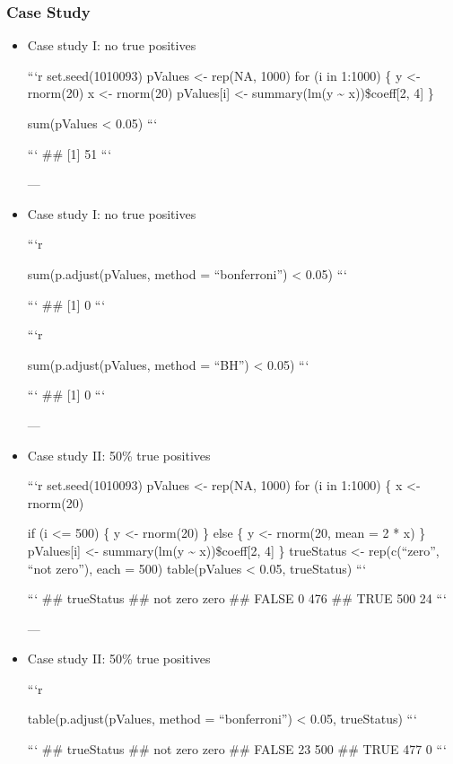 \documentclass[10pt,article]{article}
\begin{document}
\subsubsection{Case Study}
\label{sec:orgd39c5a1}
\begin{itemize}
\item Case study I: no true positives
\label{sec:org014a8fc}


```r
set.seed(1010093)
pValues <- rep(NA, 1000)
for (i in 1:1000) \{
    y <- rnorm(20)
    x <- rnorm(20)
    pValues[i] <- summary(lm(y \textasciitilde{} x))\$coeff[2, 4]
\}

sum(pValues < 0.05)
```

```
\#\# [1] 51
```


---

\item Case study I: no true positives
\label{sec:org3feed36}


```r

sum(p.adjust(pValues, method = ``bonferroni'') < 0.05)
```

```
\#\# [1] 0
```

```r

sum(p.adjust(pValues, method = ``BH'') < 0.05)
```

```
\#\# [1] 0
```



---

\item Case study II: 50\% true positives
\label{sec:org0db8963}


```r
set.seed(1010093)
pValues <- rep(NA, 1000)
for (i in 1:1000) \{
    x <- rnorm(20)

    if (i <= 500) \{
        y <- rnorm(20)
    \} else \{
        y <- rnorm(20, mean = 2 * x)
    \}
    pValues[i] <- summary(lm(y \textasciitilde{} x))\$coeff[2, 4]
\}
trueStatus <- rep(c(``zero'', ``not zero''), each = 500)
table(pValues < 0.05, trueStatus)
```

```
\#\#        trueStatus
\#\#         not zero zero
\#\#   FALSE        0  476
\#\#   TRUE       500   24
```


---

\item Case study II: 50\% true positives
\label{sec:org03968f5}


```r

table(p.adjust(pValues, method = ``bonferroni'') < 0.05, trueStatus)
```

```
\#\#        trueStatus
\#\#         not zero zero
\#\#   FALSE       23  500
\#\#   TRUE       477    0
```


\end{itemize}
\end{document}
